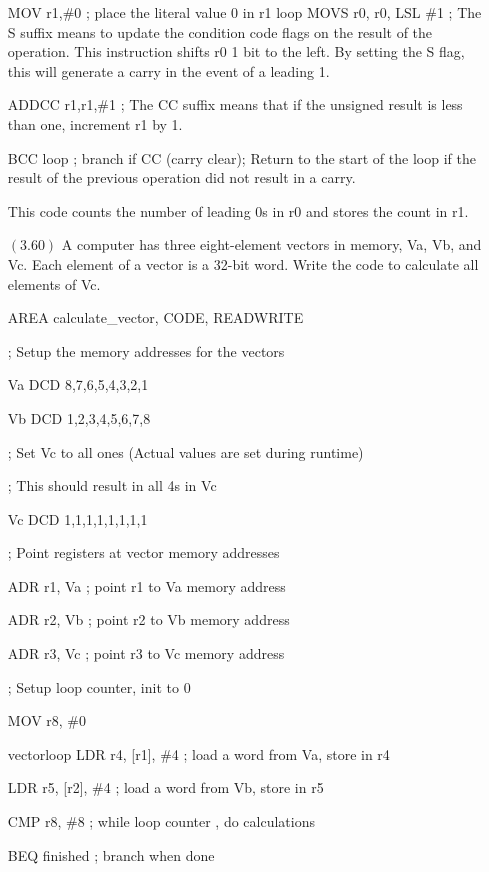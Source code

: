 \documentclass[letterpaper,10pt,titlepage]{article}
\begin{document}
\begin{enumerate}
MOV r1,\#0 ; place the literal value 0 in r1 loop MOVS r0, r0, LSL \#1 ; The S suffix means to update the condition code flags on the result of the operation. This instruction shifts r0 1 bit to the left. By setting the S flag, this will generate a carry in the event of a leading 1.

ADDCC r1,r1,\#1 ; The CC suffix means that if the unsigned result is less than one, increment r1 by 1.

BCC loop ; branch if CC (carry clear); Return to the start of the loop if the result of the previous operation did not result in a carry.

This code counts the number of leading 0s in r0 and stores the count in r1.


\item[$(3.60)$] A computer has three eight-element vectors in memory, Va, Vb, and Vc. Each element of a vector is a 32-bit word. Write the code to calculate all elements of Vc.

		AREA calculate\_vector, CODE, READWRITE


		; Setup the memory addresses for the vectors

        
        Va		DCD	8,7,6,5,4,3,2,1

        Vb		DCD	1,2,3,4,5,6,7,8

        ; Set Vc to all ones (Actual values are set during runtime)

        ; This should result in all 4s in Vc

        Vc		DCD 1,1,1,1,1,1,1,1

        

        ; Point registers at vector memory addresses

        

		ADR		r1, Va ; point r1 to Va memory address

		ADR		r2, Vb ; point r2 to Vb memory address

		ADR		r3, Vc ; point r3 to Vc memory address



		; Setup loop counter, init to 0

		MOV 	r8, \#0



vectorloop	LDR 	r4, [r1], \#4 ; load a word from Va, store in r4

		LDR 	r5, [r2], \#4 ; load a word from Vb, store in r5

		CMP 	r8, \#8 ; while loop counter , do calculations

        BEQ 	finished ; branch when done


\end{enumerate}
\end{document}
